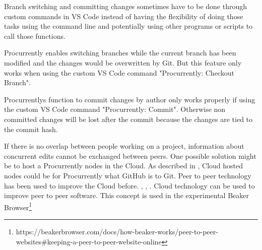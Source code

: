 Branch switching and committing changes sometimes have to be done through custom commands in VS Code instead of having the flexibility of doing those tasks using the command line and potentially using other programs or scripts to call those functions.

Procurrently enables switching branches while the current branch has been modified and the changes would be overwritten by Git. But this feature only works when using the custom VS Code command "Procurrently: Checkout Branch".

Procurrentlys function to commit changes by author only works properly if using the custom VS Code command "Procurrently: Commit". Otherwise non committed changes will be lost after the commit because the changes are tied to the commit hash.

If there is no overlap between people working on a project, information about concurrent edits cannot be exchanged between peers.
One possible solution might be to host a Procurrently nodes in the Cloud. As described in \cite{6188603}, Cloud hosted nodes could be for Procurrently what GitHub is to Git. 
Peer to peer technology has been used to improve the Cloud before. \cite{Ranjan2013}, \cite{Ranjan2010}, \cite{Babaoglu:2012:DIP:2245276.2245357}. Cloud technology can be used to improve peer to peer software. This concept is used in the experimental Beaker Browser\footnote{https://beakerbrowser.com/docs/how-beaker-works/peer-to-peer-websites\#keeping-a-peer-to-peer-website-online}